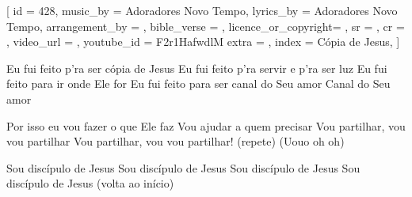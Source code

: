 [
    id                  = {428},
    music_by            = {Adoradores Novo Tempo},
    lyrics_by           = {Adoradores Novo Tempo},
    arrangement_by      = {},
    bible_verse         = {},
    licence_or_copyright= {},
    sr                  = {},
    cr                  = {},
    video_url           = {}, %
    youtube_id          = {F2r1HafwdlM}
    extra               = {},
    index               = {Cópia de Jesus},
]

\beginverse
Eu fui feito p’ra ser cópia de Jesus
Eu fui feito p’ra servir e p’ra ser luz
Eu fui feito para ir onde Ele for
Eu fui feito para ser canal do Seu amor 
Canal do Seu amor
\endverse

\beginchorus
Por isso eu vou fazer o que Ele faz
Vou ajudar a quem precisar
Vou partilhar, vou vou partilhar
Vou partilhar, vou vou partilhar! (repete)
(Uouo oh oh)
\endchorus

\beginchorus
Sou discípulo de Jesus 
Sou discípulo de Jesus 
Sou discípulo de Jesus 
Sou discípulo de Jesus
(volta ao início)
\endchorus


\endsong
